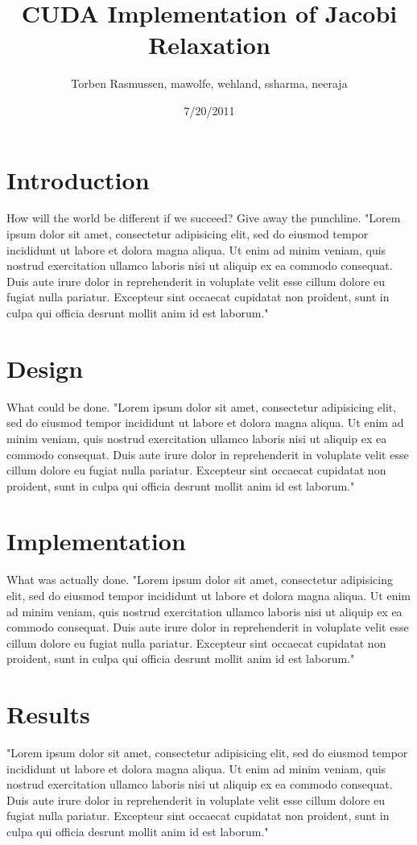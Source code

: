 \documentclass[11pt, twocolumn]{article}
\title{CUDA Implementation of Jacobi Relaxation}
\author{Torben Rasmussen, mawolfe, wehland, ssharma, neeraja}
\date{7/20/2011}
\begin{document}
\maketitle

\section{Introduction} %
How will the world be different if we succeed?
Give away the punchline.
"Lorem ipsum dolor sit amet, consectetur adipisicing elit, sed do eiusmod tempor incididunt ut labore et dolora magna aliqua.  Ut enim ad minim veniam, quis nostrud exercitation ullamco laboris nisi ut aliquip ex ea commodo consequat.  Duis aute irure dolor in reprehenderit in voluplate velit esse cillum dolore eu fugiat nulla pariatur.  Excepteur sint occaecat cupidatat non proident, sunt in culpa qui officia desrunt mollit anim id est laborum."

\section{Design}
What could be done.
"Lorem ipsum dolor sit amet, consectetur adipisicing elit, sed do eiusmod tempor incididunt ut labore et dolora magna aliqua.  Ut enim ad minim veniam, quis nostrud exercitation ullamco laboris nisi ut aliquip ex ea commodo consequat.  Duis aute irure dolor in reprehenderit in voluplate velit esse cillum dolore eu fugiat nulla pariatur.  Excepteur sint occaecat cupidatat non proident, sunt in culpa qui officia desrunt mollit anim id est laborum."

\section{Implementation}
What was actually done.
"Lorem ipsum dolor sit amet, consectetur adipisicing elit, sed do eiusmod tempor incididunt ut labore et dolora magna aliqua.  Ut enim ad minim veniam, quis nostrud exercitation ullamco laboris nisi ut aliquip ex ea commodo consequat.  Duis aute irure dolor in reprehenderit in voluplate velit esse cillum dolore eu fugiat nulla pariatur.  Excepteur sint occaecat cupidatat non proident, sunt in culpa qui officia desrunt mollit anim id est laborum."

\section{Results} %
"Lorem ipsum dolor sit amet, consectetur adipisicing elit, sed do eiusmod tempor incididunt ut labore et dolora magna aliqua.  Ut enim ad minim veniam, quis nostrud exercitation ullamco laboris nisi ut aliquip ex ea commodo consequat.  Duis aute irure dolor in reprehenderit in voluplate velit esse cillum dolore eu fugiat nulla pariatur.  Excepteur sint occaecat cupidatat non proident, sunt in culpa qui officia desrunt mollit anim id est laborum."
\end{document}
